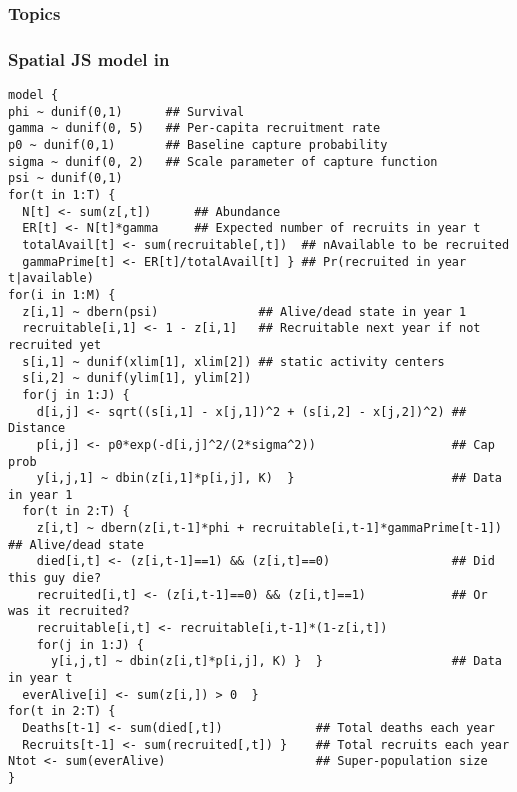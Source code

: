 \documentclass[color=usenames,dvipsnames]{beamer}\usepackage[]{graphicx}\usepackage[]{color}
\makeatletter
\newenvironment{kframe}{%
 \def\at@end@of@kframe{}%
 \ifinner\ifhmode%
  \def\at@end@of@kframe{\end{minipage}}%
  \begin{minipage}{\columnwidth}%
 \fi\fi%
 \def\FrameCommand##1{\hskip\@totalleftmargin \hskip-\fboxsep
 \colorbox{shadecolor}{##1}\hskip-\fboxsep
     \hskip-\linewidth \hskip-\@totalleftmargin \hskip\columnwidth}%
 \MakeFramed {\advance\hsize-\width
   \@totalleftmargin\z@ \linewidth\hsize
   \@setminipage}}%
 {\par\unskip\endMakeFramed%
 \at@end@of@kframe}
\newenvironment{knitrout}{}{} %
\makeatother
\begin{document}
\begin{frame}[plain]
  \frametitle{Topics}
  \Large
  \tableofcontents[currentsection]
\end{frame}



\begin{frame}[fragile]
  \frametitle{Spatial JS model in \jags}
  \tiny
\begin{knitrout}\tiny
{}\color{fgcolor}\begin{kframe}
\begin{verbatim}
model {
phi ~ dunif(0,1)      ## Survival
gamma ~ dunif(0, 5)   ## Per-capita recruitment rate
p0 ~ dunif(0,1)       ## Baseline capture probability
sigma ~ dunif(0, 2)   ## Scale parameter of capture function
psi ~ dunif(0,1)    
for(t in 1:T) {
  N[t] <- sum(z[,t])      ## Abundance
  ER[t] <- N[t]*gamma     ## Expected number of recruits in year t
  totalAvail[t] <- sum(recruitable[,t])  ## nAvailable to be recruited
  gammaPrime[t] <- ER[t]/totalAvail[t] } ## Pr(recruited in year t|available)
for(i in 1:M) {
  z[i,1] ~ dbern(psi)              ## Alive/dead state in year 1
  recruitable[i,1] <- 1 - z[i,1]   ## Recruitable next year if not recruited yet
  s[i,1] ~ dunif(xlim[1], xlim[2]) ## static activity centers
  s[i,2] ~ dunif(ylim[1], ylim[2])
  for(j in 1:J) {
    d[i,j] <- sqrt((s[i,1] - x[j,1])^2 + (s[i,2] - x[j,2])^2) ## Distance
    p[i,j] <- p0*exp(-d[i,j]^2/(2*sigma^2))                   ## Cap prob
    y[i,j,1] ~ dbin(z[i,1]*p[i,j], K)  }                      ## Data in year 1
  for(t in 2:T) {
    z[i,t] ~ dbern(z[i,t-1]*phi + recruitable[i,t-1]*gammaPrime[t-1]) ## Alive/dead state 
    died[i,t] <- (z[i,t-1]==1) && (z[i,t]==0)                 ## Did this guy die?
    recruited[i,t] <- (z[i,t-1]==0) && (z[i,t]==1)            ## Or was it recruited?
    recruitable[i,t] <- recruitable[i,t-1]*(1-z[i,t])
    for(j in 1:J) {
      y[i,j,t] ~ dbin(z[i,t]*p[i,j], K) }  }                  ## Data in year t
  everAlive[i] <- sum(z[i,]) > 0  }
for(t in 2:T) {
  Deaths[t-1] <- sum(died[,t])             ## Total deaths each year
  Recruits[t-1] <- sum(recruited[,t]) }    ## Total recruits each year
Ntot <- sum(everAlive)                     ## Super-population size
}
\end{verbatim}
\end{kframe}
\end{knitrout}
\end{frame}
\end{document}
